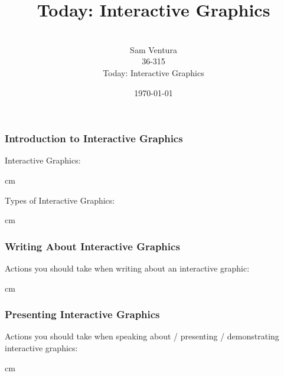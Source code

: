 \documentclass{beamer} %
\begin{document}
\title[dedup]{Today:  Interactive Graphics}


\author[Samuel L. Ventura]{\\
  \large{Sam Ventura\\36-315\\Today:  Interactive Graphics}}
\date{\today}


\begin{frame}
	\maketitle

	
\end{frame}




\begin{frame}\frametitle{Introduction to Interactive Graphics}
	\small
	Interactive Graphics:  %
	
	 cm
	
	Types of Interactive Graphics:
	
	 cm
	

\end{frame}



\begin{frame}\frametitle{Writing About Interactive Graphics}
	\small
	
	Actions you should take when writing about an interactive graphic:
	
	
	
	 cm
	
\end{frame}



\begin{frame}\frametitle{Presenting Interactive Graphics}
	\small
	
	Actions you should take when speaking about / presenting / demonstrating interactive graphics:
	
	
	 cm

\end{frame}
\end{document}
